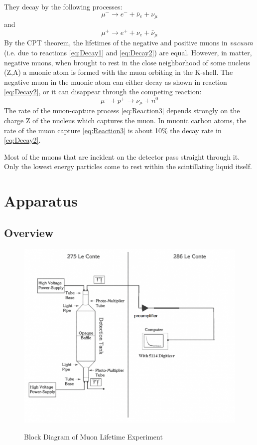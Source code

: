 \documentclass{../lab}
\begin{document}
They decay by the following processes:
\begin{equation}
\label{eq:Decay1}
    \mu^-\rightarrow e^-+\bar{\nu}_e+\nu_\mu
\end{equation}
and
\begin{equation}
\label{eq:Decay2}
    \mu^+\rightarrow e^++\nu_e+\bar{\nu}_\mu
\end{equation}
By the CPT theorem, the lifetimes of the negative and positive muons in \emph{vacuum} (i.e. due to reactions \eqref{eq:Decay1} and \eqref{eq:Decay2}) are equal. However, in matter, negative muons, when brought to rest in the close neighborhood of some nucleus (Z,A) a muonic atom is formed with the muon orbiting in the K-shell. The negative muon in the muonic atom can either decay as shown in reaction \eqref{eq:Decay2}, or it can disappear through the competing reaction:
\begin{equation}
\label{eq:Reaction3}
    \mu^- + p^+ \rightarrow \nu_{\mu}+n^0
\end{equation}
The rate of the muon-capture process \eqref{eq:Reaction3} depends strongly on the charge Z of the nucleus which captures the muon. In muonic carbon atoms, the rate of the muon capture \eqref{eq:Reaction3} is about 10\% the decay rate in \eqref{eq:Decay2}.

Most of the muons that are incident on the detector pass straight through it. Only the lowest energy particles come to rest within the scintillating liquid itself.

\section{Apparatus}

\subsection{Overview}

\begin{figure}[h]
    \centering
    \href{http://experimentationlab.berkeley.edu/sites/default/files/images/750px-Muon_Equip_New_fig1.png}{\includegraphics[width=0.5\linewidth]{images/750px-Muon_Equip_New_fig1.png}}
    \caption{Block Diagram of Muon Lifetime Experiment}
    \label{fig:BlockDiagram}
\end{figure}
\end{document}
